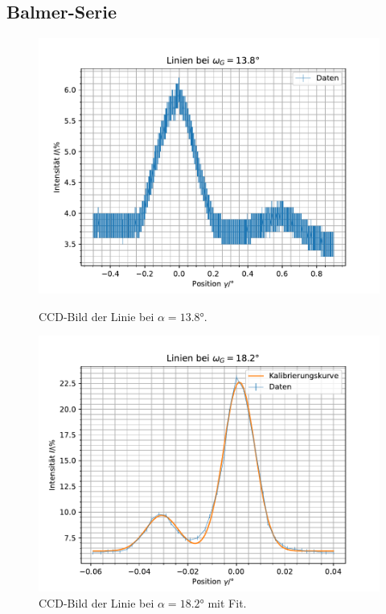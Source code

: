 \documentclass{article}
\begin{document}
\subsection{Balmer-Serie}
\begin{figure}[h!]
  \centering
  \begin{minipage}{0.49\textwidth}
    \includegraphics[width=\textwidth]{line13.8.pdf}
    \caption{CCD-Bild der Linie bei $\alpha=\ang{13.8}$.}
  \end{minipage}
  \hfill
  \begin{minipage}{0.49\textwidth}
    \includegraphics[width=\textwidth]{line18.2.pdf}
    \caption{CCD-Bild der Linie bei $\alpha=\ang{18.2}$ mit Fit.}
  \end{minipage}


\end{figure}
\end{document}
